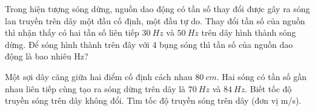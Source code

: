 














\setcounter{paragraph}{0}
\setcounter{ex}{0}
\PhanIII
\begin{ex}
Trong hiện tượng sóng dừng, nguồn dao động có tần số thay đổi được gây ra sóng lan truyền trên dây một đầu cố định, một đầu tự do. Thay đổi tần số của nguồn thì nhận thấy có hai tần số liên tiếp $30 ~Hz$ và $50 ~Hz$ trên dây hình thành sóng dừng. Để sóng hình thành trên đây với 4 bụng sóng thì tần số của nguồn dao động là bao nhiêu Hz?\\
\end{ex} 
\begin{ex}
Một sợi dây căng giữa hai điểm cố định cách nhau $80 ~cm$. Hai sóng có tần số gần nhau liên tiếp cùng tạo ra sóng dừng trên dây là $70 ~Hz$ và $84 ~Hz$. Biết tốc độ truyền sóng trên dây không đổi. Tìm tốc độ truyền sóng trên dây (đơn vị m/s).\\
\end{ex} 



